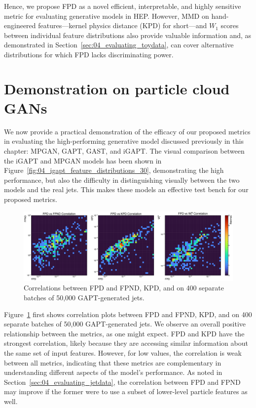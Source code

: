 Hence, we propose FPD as a novel efficient, interpretable, and highly sensitive metric for evaluating generative models in HEP.
However, MMD on hand-engineered features---kernel physics distance (KPD) for short---and $W_1$ scores between individual feature distributions also provide valuable information and, as demonstrated in Section~\ref{sec:04_evaluating_toydata}, can cover alternative distributions for which FPD lacks discriminating power.


\section{Demonstration on particle cloud GANs}
\label{sec:04_evaluating_models}

We now provide a practical demonstration of the efficacy of our proposed metrics in evaluating the high-performing generative model discussed previously in this chapter: MPGAN, GAPT, GAST, and iGAPT.
The visual comparison between the iGAPT and MPGAN models has been shown in Figure~\ref{fig:04_igapt_feature_distributions_30}, demonstrating the high performance, but also the difficulty in distinguishing visually between the two models and the real jets.
This makes these models an effective test bench for our proposed metrics.


\begin{figure}[ht]
    \includegraphics[width=\textwidth]{figures/04-ML4Sim/evaluating/162_correlations.pdf}
    \caption{Correlations between FPD and FPND, KPD, and \wassm on 400 separate batches of 50,000 GAPT-generated jets.}
    \label{fig:04_evaluating_correlations}
\end{figure}

Figure~\ref{fig:04_evaluating_correlations} first shows correlation plots between FPD and FPND, KPD, and \wassm on 400 separate batches of 50,000 GAPT-generated jets.
We observe an overall positive relationship between the metrics, as one might expect.
FPD and KPD have the strongest correlation, likely because they are accessing similar information about the same set of input features.
However, for low values, the correlation is weak between all metrics, indicating that these metrics are complementary in understanding different aspects of the model's performance.
As noted in Section~\ref{sec:04_evaluating_jetdata}, the correlation between FPD and FPND may improve if the former were to use a subset of lower-level particle features as well.


